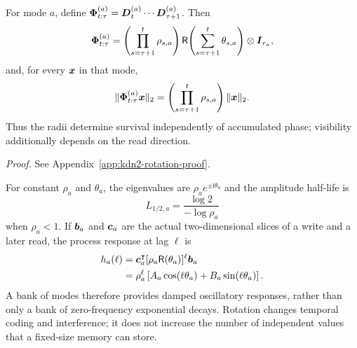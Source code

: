 \documentclass[11pt,letterpaper,logo]{yalearxiv}
\newcommand{\Rot}{\mathsf{R}}
\begin{document}
\label{prop:kdn2-rotation}
\begin{tcolorbox}[
  title={Proposition~\thedefinition: Damped Rotational Composition},
  colback=blue!7,
  colbacktitle=blue!22,
  colframe=blue!45!black,
  coltitle=black,
  fonttitle=\bfseries,
  boxrule=0.4pt,
  arc=1pt,
  left=5pt,
  right=5pt,
  top=5pt,
  bottom=5pt
]
For mode $a$, define
$\boldsymbol{\Phi}_{t:\tau}^{(a)}
=\boldsymbol{D}_t^{(a)}\cdots\boldsymbol{D}_{\tau+1}^{(a)}$. Then
\begin{equation}
  \ve{\Phi}_{t:\tau}^{(a)}
  =
  \left(\prod_{s=\tau+1}^{t}\rho_{s,a}\right)
  \Rot\!\left(\sum_{s=\tau+1}^{t}\theta_{s,a}\right)
  \otimes\ve{I}_{r_a},
  \label{eq:kdn2-rotation-product}
\end{equation}
and, for every $\boldsymbol{x}$ in that mode,
\begin{equation}
  \|\boldsymbol{\Phi}_{t:\tau}^{(a)}\boldsymbol{x}\|_2
  =
  \left(\prod_{s=\tau+1}^{t}\rho_{s,a}\right)\|\boldsymbol{x}\|_2.
  \label{eq:kdn2-rotation-norm}
\end{equation}
Thus the radii determine survival independently of accumulated phase; visibility additionally
depends on the read direction.
\end{tcolorbox}

\noindent\textit{Proof.} See Appendix~\ref{app:kdn2-rotation-proof}.

For constant $\rho_a$ and $\theta_a$, the eigenvalues are
$\rho_a e^{\pm\mathrm{i}\theta_a}$ and the amplitude half-life is
\begin{equation}
  L_{1/2,a}
  =
  \frac{\log 2}{-\log\rho_a}
  \label{eq:kdn2-half-life}
\end{equation}
when $\rho_a<1$. If $\boldsymbol{b}_a$ and $\boldsymbol{c}_a$ are the actual two-dimensional slices of a write
and a later read, the process response at lag $\ell$ is
\begin{equation}
\begin{aligned}
  h_a(\ell)
  &=
  \ve{c}_a^{\tr}
  [\rho_a\Rot(\theta_a)]^\ell
  \ve{b}_a\\
  &=
  \rho_a^\ell
  \left[
    A_a\cos(\ell\theta_a)+B_a\sin(\ell\theta_a)
  \right].
\end{aligned}
\label{eq:kdn2-mode-response}
\end{equation}
A bank of modes therefore provides damped oscillatory responses, rather than only a bank of
zero-frequency exponential decays. Rotation changes temporal coding and interference; it does not
increase the number of independent values that a fixed-size memory can store.
\end{document}
